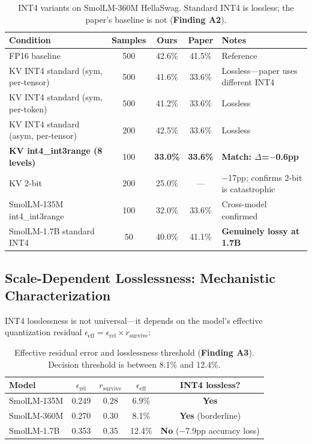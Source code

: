 \documentclass{article}
\begin{document}
\begin{table}[h]
\centering
\caption{INT4 variants on SmolLM-360M HellaSwag. Standard INT4 is lossless; the paper's baseline is not (\textbf{Finding A2}).}
\begin{tabular}{lcccl}
\toprule
Condition & Samples & Ours & Paper & Notes \\
\midrule
FP16 baseline & 500 & 42.6\% & 41.5\% & Reference \\
KV INT4 standard (sym, per-tensor) & 500 & 41.6\% & 33.6\% & Lossless---paper uses different INT4 \\
KV INT4 standard (sym, per-token) & 500 & 41.2\% & 33.6\% & Lossless \\
KV INT4 standard (asym, per-tensor) & 200 & 42.5\% & 33.6\% & Lossless \\
\textbf{KV int4\_int3range (8 levels)} & 100 & \textbf{33.0\%} & \textbf{33.6\%} & \textbf{Match: $\Delta$=$-$0.6pp} \\
KV 2-bit & 200 & 25.0\% & --- & $-$17pp; confirms 2-bit is catastrophic \\
SmolLM-135M int4\_int3range & 100 & 32.0\% & 33.6\% & Cross-model confirmed \\
SmolLM-1.7B standard INT4 & 50 & 40.0\% & 41.1\% & \textbf{Genuinely lossy at 1.7B} \\
\bottomrule
\end{tabular}
\end{table}

\subsection{Scale-Dependent Losslessness: Mechanistic Characterization}
\label{app:lossless}

INT4 losslessness is not universal---it depends on the model's effective quantization residual $\epsilon_\text{eff} = \epsilon_\text{rel} \times r_\text{survive}$:

\begin{table}[h]
\centering
\caption{Effective residual error and losslessness threshold (\textbf{Finding A3}). Decision threshold is between 8.1\% and 12.4\%.}
\begin{tabular}{lcccc}
\toprule
Model & $\epsilon_\text{rel}$ & $r_\text{survive}$ & $\epsilon_\text{eff}$ & INT4 lossless? \\
\midrule
SmolLM-135M & 0.249 & 0.28 & 6.9\% & \textbf{Yes} \\
SmolLM-360M & 0.270 & 0.30 & 8.1\% & \textbf{Yes} (borderline) \\
SmolLM-1.7B & 0.353 & 0.35 & 12.4\% & \textbf{No} ($-$7.9pp accuracy loss) \\
\bottomrule
\end{tabular}
\end{table}
\end{document}
